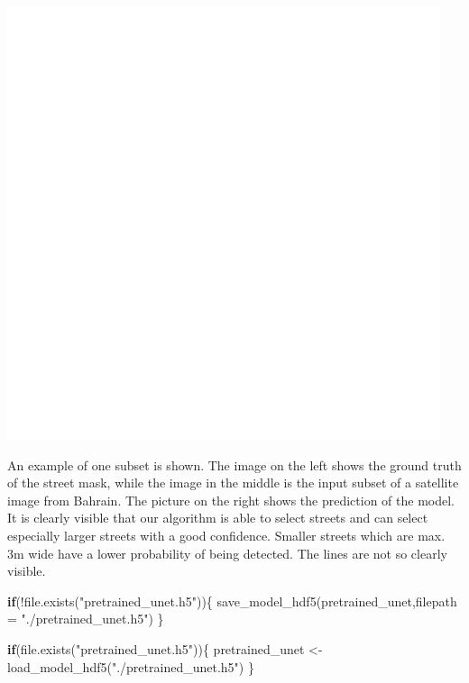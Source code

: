 \documentclass[
]{article}
\newenvironment{Shaded}{\begin{snugshade}}{\end{snugshade}}
\newcommand{\AttributeTok}[1]{\textcolor[rgb]{0.77,0.63,0.00}{#1}}
\newcommand{\ControlFlowTok}[1]{\textcolor[rgb]{0.13,0.29,0.53}{\textbf{#1}}}
\newcommand{\FunctionTok}[1]{\textcolor[rgb]{0.00,0.00,0.00}{#1}}
\newcommand{\NormalTok}[1]{#1}
\newcommand{\OtherTok}[1]{\textcolor[rgb]{0.56,0.35,0.01}{#1}}
\newcommand{\SpecialCharTok}[1]{\textcolor[rgb]{0.00,0.00,0.00}{#1}}
\newcommand{\StringTok}[1]{\textcolor[rgb]{0.31,0.60,0.02}{#1}}
\begin{document}
\includegraphics{images/prediction_sample.png}

An example of one subset is shown. The image on the left shows the
ground truth of the street mask, while the image in the middle is the
input subset of a satellite image from Bahrain. The picture on the right
shows the prediction of the model. It is clearly visible that our
algorithm is able to select streets and can select especially larger
streets with a good confidence. Smaller streets which are max. 3m wide
have a lower probability of being detected. The lines are not so clearly
visible.

\begin{Shaded}
\begin{Highlighting}[]
\ControlFlowTok{if}\NormalTok{(}\SpecialCharTok{!}\FunctionTok{file.exists}\NormalTok{(}\StringTok{"pretrained\_unet.h5"}\NormalTok{))\{}
  \FunctionTok{save\_model\_hdf5}\NormalTok{(pretrained\_unet,}\AttributeTok{filepath =} \StringTok{"./pretrained\_unet.h5"}\NormalTok{)}
\NormalTok{\}}
\end{Highlighting}
\end{Shaded}

\begin{Shaded}
\begin{Highlighting}[]
\ControlFlowTok{if}\NormalTok{(}\FunctionTok{file.exists}\NormalTok{(}\StringTok{"pretrained\_unet.h5"}\NormalTok{))\{}
\NormalTok{  pretrained\_unet }\OtherTok{\textless{}{-}} \FunctionTok{load\_model\_hdf5}\NormalTok{(}\StringTok{"./pretrained\_unet.h5"}\NormalTok{)}
\NormalTok{\}}
\end{Highlighting}
\end{Shaded}
\end{document}
